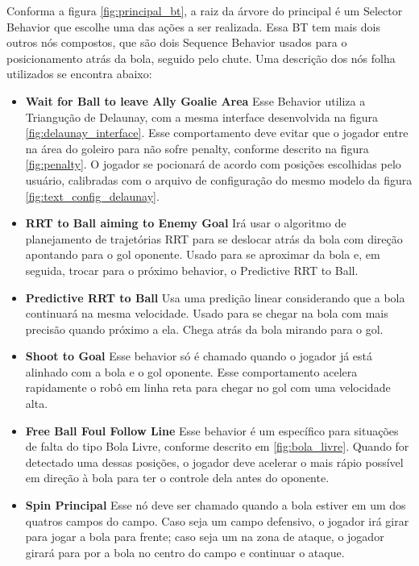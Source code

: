 \documentclass[a4paper,12pt]{article}
\begin{document}
Conforma a figura \ref{fig:principal_bt}, a raiz da árvore do principal é um Selector Behavior que escolhe uma das ações a ser realizada. Essa BT tem mais dois outros nós compostos, que são dois Sequence Behavior usados para o posicionamento atrás da bola, seguido pelo chute. Uma descrição dos nós folha utilizados se encontra abaixo:

\begin{itemize}

\item \textbf{Wait for Ball to leave Ally Goalie Area} Esse Behavior utiliza a Triangução de Delaunay, com a mesma interface desenvolvida na figura \ref{fig:delaunay_interface}. Esse comportamento deve evitar que o jogador entre na área do goleiro para não sofre penalty, conforme descrito na figura \ref{fig:penalty}. O jogador se pocionará de acordo com posições escolhidas pelo usuário, calibradas com o arquivo de configuração do mesmo modelo da figura \ref{fig:text_config_delaunay}.

\item \textbf{RRT to Ball aiming to Enemy Goal} Irá usar o algoritmo de planejamento de trajetórias RRT para se deslocar atrás da bola com direção apontando para o gol oponente. Usado para se aproximar da bola e, em seguida, trocar para o próximo behavior, o Predictive RRT to Ball.

\item \textbf{Predictive RRT to Ball} Usa uma predição linear considerando que a bola continuará na mesma velocidade. Usado para se chegar na bola com mais precisão quando próximo a ela. Chega atrás da bola mirando para o gol.

\item \textbf{Shoot to Goal} Esse behavior só é chamado quando o jogador já está alinhado com a bola e o gol oponente. Esse comportamento acelera rapidamente o robô em linha reta para chegar no gol com uma velocidade alta.

\item \textbf{Free Ball Foul Follow Line} Esse behavior é um específico para situações de falta do tipo Bola Livre, conforme descrito em \ref{fig:bola_livre}. Quando for detectado uma dessas posições, o jogador deve acelerar o mais rápio possível em direção à bola para ter o controle dela antes do oponente.

\item \textbf{Spin Principal} Esse nó deve ser chamado quando a bola estiver em um dos quatros campos do campo. Caso seja um campo defensivo, o jogador irá girar para jogar a bola para frente; caso seja um na zona de ataque, o jogador girará para por a bola no centro do campo e continuar o ataque.


\end{itemize}
\end{document}
